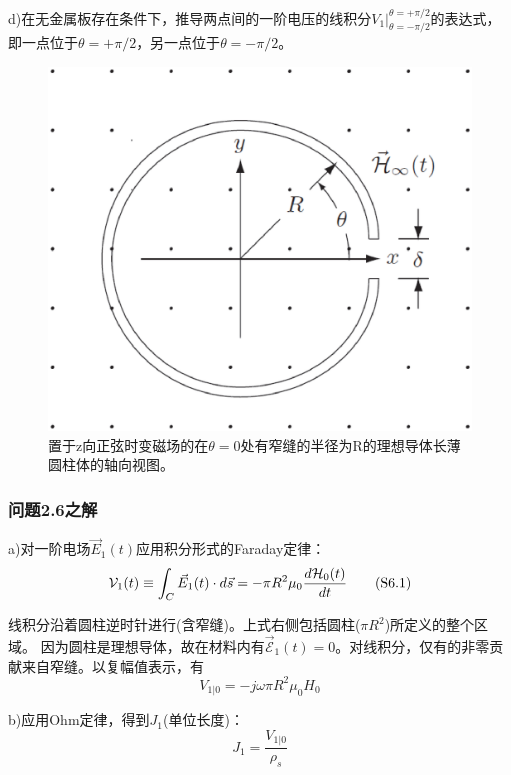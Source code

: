 d)在无金属板存在条件下，推导两点间的一阶电压的线积分$V_1 |_{\theta=-\pi/2}^{\theta=+\pi/2}$的表达式，即一点位于$\theta=+\pi/2$，另一点位于$\theta=-\pi/2$。

\begin{figure}[htbp]
  \centering
 \includegraphics[scale=0.4]{chpt2/figs/fig2.9.eps}
  \caption{置于z向正弦时变磁场的在$\theta=0$处有窄缝的半径为R的理想导体长薄圆柱体的轴向视图。}
\end{figure}

\subsubsection*{问题2.6之解}
a)对一阶电场$\vec{E}_1(t)$应用积分形式的Faraday定律：
\begin{equation*}
\CMcal{V}_1(t) \equiv \int_{C} \vec{E}_1 (t) \cdot d\vec{s}=-\pi R^2 \mu_0 \frac{d\CMcal{H}_0(t)}{dt} \tag{S6.1}
\end{equation*}

线积分沿着圆柱逆时针进行(含窄缝)。上式右侧包括圆柱($\pi R^2$)所定义的整个区域。
因为圆柱是理想导体，故在材料内有$\vec{\mathcal{E}}_1(t)=0$。对线积分，仅有的非零贡献来自窄缝。以复幅值表示，有
\begin{equation*}
V_{1|0}=-j\omega \pi R^2 \mu_0 H_0 \tag{2.55}
\end{equation*}

b)应用Ohm定律，得到$J_1$(单位长度)：
\begin{equation*}
J_1=\frac{V_{1|0}}{\rho_s} \tag{S6.2}
\end{equation*}

